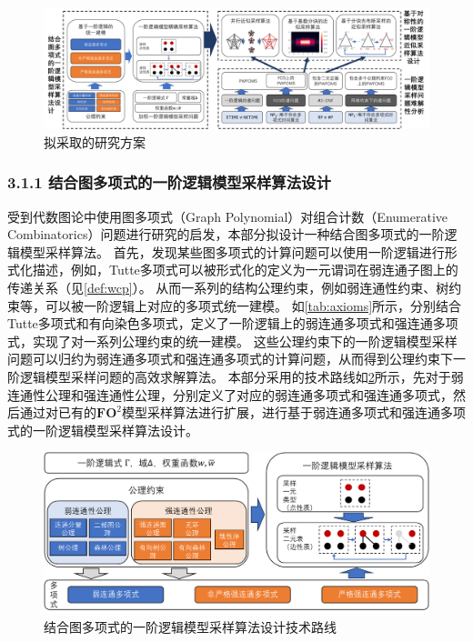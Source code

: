 \documentclass[12pt,UTF8,AutoFakeBold=3,a4paper]{ctexart} %
\newcommand{\fotwo}{\ensuremath{\mathbf{FO}^2}}
\begin{document}
\begin{figure}[H]
  \centering
  \includegraphics[width=\textwidth]{figs/plan.pdf}
  \caption{拟采取的研究方案}
  \label{fig:plan}
\end{figure}

\subsubsection{3.1.1 结合图多项式的一阶逻辑模型采样算法设计}


受到代数图论中使用图多项式（Graph Polynomial）对组合计数（Enumerative Combinatorics）问题进行研究的启发，本部分拟设计一种结合图多项式的一阶逻辑模型采样算法。
首先，发现某些图多项式的计算问题可以使用一阶逻辑进行形式化描述，例如，Tutte多项式可以被形式化的定义为一元谓词在弱连通子图上的传递关系（见\cref{def:wcp}）。
从而一系列的结构公理约束，例如弱连通性约束、树约束等，可以被一阶逻辑上对应的多项式统一建模。
如\cref{tab:axioms}所示，分别结合Tutte多项式和有向染色多项式，定义了一阶逻辑上的弱连通多项式和强连通多项式，实现了对一系列公理约束的统一建模。
这些公理约束下的一阶逻辑模型采样问题可以归约为弱连通多项式和强连通多项式的计算问题，从而得到公理约束下一阶逻辑模型采样问题的高效求解算法。
本部分采用的技术路线如\cref{fig:polynomial}所示，先对于弱连通性公理和强连通性公理，分别定义了对应的弱连通多项式和强连通多项式，然后通过对已有的\fotwo{}模型采样算法进行扩展，进行基于弱连通多项式和强连通多项式的一阶逻辑模型采样算法设计。

\begin{figure}[t]
  \centering
  \includegraphics[width=\textwidth]{figs/polynomial.pdf}
  \caption{结合图多项式的一阶逻辑模型采样算法设计技术路线}
  \label{fig:polynomial}
\end{figure}
\end{document}

